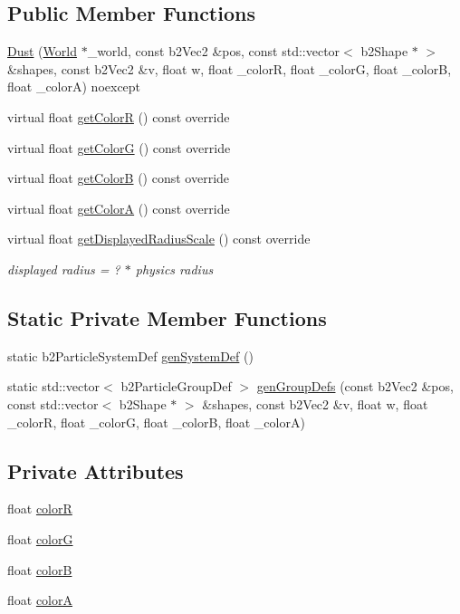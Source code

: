 \subsection*{Public Member Functions}
\begin{DoxyCompactItemize}
\item 
\hyperlink{classDust_a43719fa4b8745b2bd2eb72f2590786c2}{Dust} (\hyperlink{classWorld}{World} $\ast$\+\_\+world, const b2\+Vec2 \&pos, const std\+::vector$<$ b2\+Shape $\ast$ $>$ \&shapes, const b2\+Vec2 \&v, float w, float \+\_\+color\+R, float \+\_\+color\+G, float \+\_\+color\+B, float \+\_\+color\+A) noexcept
\item 
virtual float \hyperlink{classDust_a2e5d596ac110553eb401eae59641fb5a}{get\+Color\+R} () const override
\item 
virtual float \hyperlink{classDust_a386313dcd344747fb28bb809f6243bf8}{get\+Color\+G} () const override
\item 
virtual float \hyperlink{classDust_a088431d5f6a114d93f12cae63592a8dd}{get\+Color\+B} () const override
\item 
virtual float \hyperlink{classDust_a6a61ed84ae1cbba8d0cdbc102a343f0f}{get\+Color\+A} () const override
\item 
virtual float \hyperlink{classDust_a6e96475d0b48ffcfb443c014ad369276}{get\+Displayed\+Radius\+Scale} () const override
\begin{DoxyCompactList}\small\item\em displayed radius = ? $\ast$ physics radius \end{DoxyCompactList}\end{DoxyCompactItemize}
\subsection*{Static Private Member Functions}
\begin{DoxyCompactItemize}
\item 
static b2\+Particle\+System\+Def \hyperlink{classDust_a91cc6bf0a6060b14fa4e21759f3581c8}{gen\+System\+Def} ()
\item 
static std\+::vector$<$ b2\+Particle\+Group\+Def $>$ \hyperlink{classDust_a13883a1eaaf0e0e07529060dca61f6c9}{gen\+Group\+Defs} (const b2\+Vec2 \&pos, const std\+::vector$<$ b2\+Shape $\ast$ $>$ \&shapes, const b2\+Vec2 \&v, float w, float \+\_\+color\+R, float \+\_\+color\+G, float \+\_\+color\+B, float \+\_\+color\+A)
\end{DoxyCompactItemize}
\subsection*{Private Attributes}
\begin{DoxyCompactItemize}
\item 
float \hyperlink{classDust_a38fced9e145e03d4bb548924bd99a7fd}{color\+R}
\item 
float \hyperlink{classDust_a97d9fa2655101d2ea41c1a6a5f89bd32}{color\+G}
\item 
float \hyperlink{classDust_a3c3ad4aa31b2d0220cab1569743bb836}{color\+B}
\item 
float \hyperlink{classDust_aa726a6672b4777821df8efaa789549a3}{color\+A}
\end{DoxyCompactItemize}
